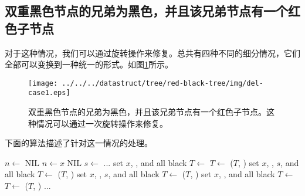 \documentclass[UTF8]{article}
\begin{document}
\subsection{双重黑色节点的兄弟为黑色，并且该兄弟节点有一个红色子节点}
对于这种情况，我们可以通过旋转操作来修复。总共有四种不同的细分情况，它们全部可以变换到一种统一的形式。如图\ref{fig:del-case1}所示。

\begin{figure}[htbp]
   \centering
   \texttt{[image: ../../../datastruct/tree/red-black-tree/img/del-case1.eps]}
   \caption{双重黑色节点的兄弟为黑色，并且该兄弟节点有一个红色子节点。这种情况可以通过一次旋转操作来修复。}
   \label{fig:del-case1}
\end{figure}

下面的算法描述了针对这一情况的处理。

\begin{algorithmic}[1]
  \State $n \gets$ NIL
    
    \State $n \gets x$
  \EndIf
   
    \State \Return NIL
  \EndIf
     
        \State $s \gets$ 
        \State ...
            \State set $x$, , and  all black
            \State $T \gets$ 
            \State $T \gets$ ($T$, )
          \Else {}
            \State set $x$, , $s$, and  all black
            \State $T \gets$ ($T$, )
          \EndIf
           
            \State set $x$, , $s$, and  all black
            \State $T \gets$ ($T$, )
          \Else {}
            \State set $x$, , and  all black
            \State $T \gets$ 
            \State $T \gets$ ($T$, )
          \EndIf
        \State ...
        \EndIf
    \EndIf
  \EndWhile
\EndFunction
\end{algorithmic}
\end{document}
